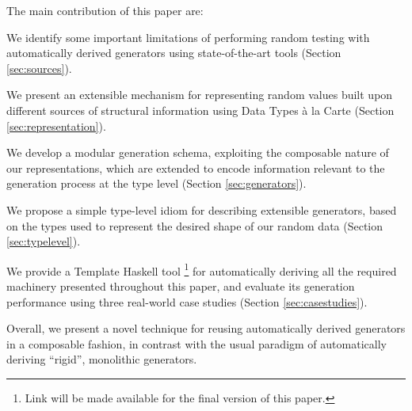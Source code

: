 %
%
The main contribution of this paper are:
%
\begin{CompactItemize}
\item We identify some important limitations of performing random testing with
  automatically derived generators using state-of-the-art tools (Section
  \ref{sec:sources}).
\item We present an extensible mechanism for representing random values built
  upon different sources of structural information using Data Types \`a la Carte
  (Section \ref{sec:representation}).
\item We develop a modular generation schema, exploiting the composable nature
  of our representations, which are extended to encode information relevant to
  the generation process at the type level (Section \ref{sec:generators}).
\item We propose a simple type-level idiom for describing extensible generators,
  based on the types used to represent the desired shape of our random data
  (Section \ref{sec:typelevel}).
\item We provide a Template Haskell tool%
  \footnote{Link will be made available for the final version of this paper.}
  for automatically deriving all the required machinery presented throughout
  this paper, and evaluate its generation performance using three real-world
  case studies (Section \ref{sec:casestudies}).
\end{CompactItemize}
%
Overall, we present a novel technique for reusing automatically derived
generators in a composable fashion, in contrast with the usual paradigm of
automatically deriving ``rigid'', monolithic generators.
